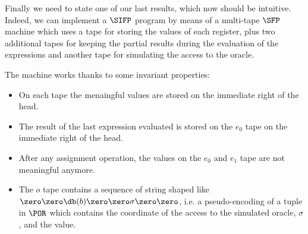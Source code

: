 \begin{comment}
\item If teh parameter is $\sigma b$, we have one more induction hypothesis which builds appropriate $g_\sigma$ and $k_\sigma$ for the $\sigma$ prefix. In this case we just need to instantiate that hypothesis on its proper inputs, then use the IH on $h_b$ instantiatinf it on its input, shift the function obtained by $k_\sigma$ and then $k_\sigma+k_{h_b}$ is the $k$ which we need to introduce and the function is the union of the $g_\sigma$ and the shifted function.
\end{itemize}
It is simple to verify that both the two conclusions hold.
\end{itemize}
\end{proof}

Since the implementation of $\POR$ is $\SIFP$ is $\omega$-conservative, we should state a similar result for the program $P$ obtained with the procedure described in Lemma \ref{lemma:portosifp}. Formally:

\begin{lemma}
\label{lemma:sifpmap}
$\forall f \in \POR. \forall \vec x \in \SS. \forall \omega \in \OO. \exists g\in \SS^\Nat. \exists k \in \Nat. \forall j \in \Nat. j < k \to \forall \omega' \omega'(g(j))\neq\omega(g(j))\to \LL(f)(\vec x, \omega)\neq \LL(f)(\vec x, \omega')$. Moreover the size of the function's graph is polynomial.
\end{lemma}
\begin{proof}
In Lemma \ref{lemma:portosifp}, we have proved that the translation $\LL(\cdot)$ preserves the behaviour of the program, fixed $\omega$, so the result is a consequence of Lemma \ref{lemma:pormap}.
\end{proof}
\end{comment}


Finally we need to state one of our last results, which now should be intuitive. Indeed, we can implement a $\SIFP$ program by means of a multi-tape $\SFP$ machine which uses a tape for storing the values of each register, plus two additional tapes for keeping the partial results during the evaluation of the expressions and another tape for simulating the access to the oracle.

The machine works thanks to some invariant properties:

\begin{itemize}
\item On each tape the menaingful values are stored on the immediate right of the head.
\item The result of the last expression evaluated is stored on the $e_0$ tape on the immediate right of the head.
\item After any assignment operation, the values on the $e_0$ and $e_1$ tape are not meaningful anymore.
\item The $o$ tape contains a sequence of string shaped like $\zero \zero \db (b)\zero \zero \sigma \zero\zero$, i.e. a pseudo-encoding of a tuple in $\POR$ which contains the coordinate of the access to the simulated oracle, $\sigma$, and the value.
\end{itemize}

